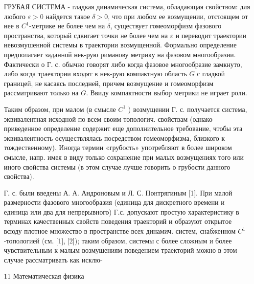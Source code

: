 \documentclass[10pt]{article}
\begin{document}
ГРУБАЯ СИСТЕМА - гладкая динамическая система, обладающая свойством: для любого $\varepsilon>0$ найдется такое $\delta>0$, что при любом ее возмущении, отстоящем от нее в $C^{1}$-метрике не более чем на $\delta$, существует гомеоморфизм фазового пространства, который сдвигает точки не более чем на $\varepsilon$ и переводит траектории невозмушенной системы в траектории возмущенной. Формально определение предполагает заданной нек-рую риманову метрику на фазовом многообразии. Фактически о Г. с. обычно говорят либо когда фазовое многообразие замкнуто, либо когда траектории входят в нек-рую компактную область $G$ с гладкой границей, не касаясь последней, причем возмущение и гомеоморфизм рассматривают только на $G$. Ввиду компактности выбор метрики не играет роли.



Таким образом, при малом (в смысле $C^{1}$ ) возмущении Г. с. получается система, эквивалентная исходной по всем своим топологич. свойствам (однако приведенное определение содержит еще дополнительное требование, чтобы эта эквивалентность осуществлялась посредством гомеоморфизма, близкого к тождественному). Иногда термин «грубость» употребляют в более широком смысле, напр. имея в виду только сохранение при малых возмущениях того или иного свойства системы (в этом случае лучше говорить о грубости данного свойства).



Г. с. были введены А. А. Андроновым и Л. С. Понтрягиным [1]. При малой размерности фазового многообразия (единица для дискретного времени и единица или два для непрерывного) Г.с. допускают простую характеристику в терминах качественных свойств поведения траекторий и образуют открытое всюду плотное множество в пространстве всех динамич. систем, снабженном $C^{1}$-топологией (см. [1], [2]); таким образом, системы с более сложным и более чувствительным к малым возмушениям поведением траекторий можно в этом случае рассматривать как исклю-



11 Математическая физика
\end{document}
